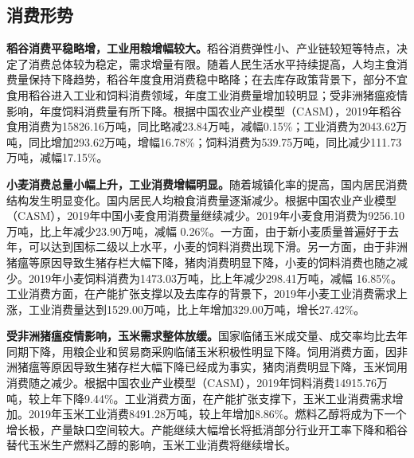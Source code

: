 \documentclass{progbookcn}
\begin{document}
\subsection{消费形势}
\textbf{稻谷消费平稳略增，工业用粮增幅较大。}稻谷消费弹性小、产业链较短等特点，决定了消费总体较为稳定，需求增量有限。随着人民生活水平持续提高，人均主食消费量保持下降趋势，稻谷年度食用消费稳中略降；在去库存政策背景下，部分不宜食用稻谷进入工业和饲料消费领域，年度工业消费量增加较明显；受非洲猪瘟疫情影响，年度饲料消费量有所下降。根据中国农业产业模型（CASM），2019年稻谷食用消费为15826.16万吨，同比略减23.84万吨，减幅0.15\%；工业消费为2043.62万吨，同比增加293.62万吨，增幅16.78\%；饲料消费为539.75万吨，同比减少111.73万吨，减幅17.15\%。

\textbf{小麦消费总量小幅上升，工业消费增幅明显。}随着城镇化率的提高，国内居民消费结构发生明显变化。国内居民人均粮食消费量逐渐减少。根据中国农业产业模型（CASM），2019年中国小麦食用消费量继续减少。2019年小麦食用消费为9256.10万吨，比上年减少23.90万吨，减幅 0.26\%。一方面，由于新小麦质量普遍好于去年，可以达到国标二级以上水平，小麦的饲料消费出现下滑。另一方面，由于非洲猪瘟等原因导致生猪存栏大幅下降，猪肉消费明显下降，小麦的饲料消费也随之减少。2019年小麦饲料消费为1473.03万吨，比上年减少298.41万吨，减幅 16.85\%。工业消费方面，在产能扩张支撑以及去库存的背景下，2019年小麦工业消费需求上涨，工业消费量达到1529.00万吨，比上年增加329.00万吨，增长27.42\%。

\textbf{受非洲猪瘟疫情影响，玉米需求整体放缓。}国家临储玉米成交量、成交率均比去年同期下降，用粮企业和贸易商采购临储玉米积极性明显下降。饲用消费方面，因非洲猪瘟等原因导致生猪存栏大幅下降已经成为事实，猪肉消费明显下降，玉米饲用消费随之减少。根据中国农业产业模型（CASM），2019年饲料消费14915.76万吨，较上年下降9.44\%。工业消费方面，在产能扩张支撑下，玉米工业消费需求增加。2019年玉米工业消费8491.28万吨，较上年增加8.86\%。燃料乙醇将成为下一个增长极，产量缺口空间较大。产能继续大幅增长将抵消部分行业开工率下降和稻谷替代玉米生产燃料乙醇的影响，玉米工业消费将继续增长。
\end{document}
